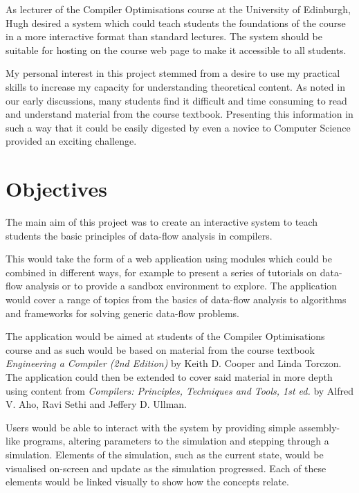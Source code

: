 \documentclass[bsc,twoside,singlespacing,parskip,logo,notimes,normalheadings]{infthesis}
\begin{document}
    As lecturer of the Compiler Optimisations course at the University
    of Edinburgh, Hugh desired a system which could teach students the
    foundations of the course in a more interactive format than
    standard lectures. The system should be suitable for hosting on
    the course web page to make it accessible to all students.
    
    My personal interest in this project stemmed from a desire to use
    my practical skills to increase my capacity for understanding
    theoretical content. As noted in our early discussions, many
    students find it difficult and time consuming to read and
    understand material from the course textbook. Presenting this
    information in such a way that it could be easily digested by even
    a novice to Computer Science provided an exciting challenge.
    
    
    \section{Objectives}
    The main aim of this project was to create an interactive system
    to teach students the basic principles of data-flow analysis in
    compilers.
    
    This would take the form of a web application using modules which
    could be combined in different ways, for example to present a
    series of tutorials on data-flow analysis or to provide a sandbox
    environment to explore. The application would cover a range of
    topics from the basics of data-flow analysis to algorithms and
    frameworks for solving generic data-flow problems.
    
    The application would be aimed at students of the Compiler
    Optimisations course and as such would be based on material from
    the course textbook {\em Engineering a Compiler (2nd Edition)} by
    Keith D. Cooper and Linda Torczon. The application could then be
    extended to cover said material in more depth using content from
    {\em Compilers: Principles, Techniques and Tools, 1st ed.} by
    Alfred V. Aho, Ravi Sethi and Jeffery D. Ullman.
    
    Users would be able to interact with the system by providing
    simple assembly-like programs, altering parameters to the
    simulation and stepping through a simulation. Elements of the
    simulation, such as the current state, would be visualised
    on-screen and update as the simulation progressed. Each of these
    elements would be linked visually to show how the concepts relate.
    
\end{document}

